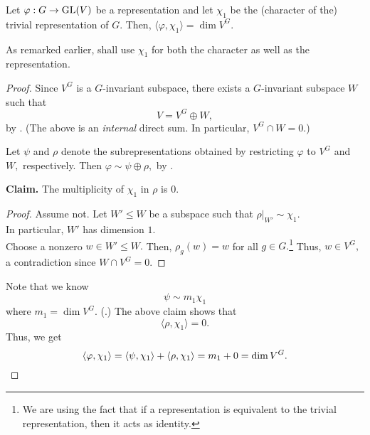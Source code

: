 \begin{prop} \label{prop:innerprodvarphichifixeddim}
	Let $\varphi : G \to \operatorname{GL}(V)$ be a representation and let $\chi_1$ be the (character of the) trivial representation of $G.$ Then, $\langle \varphi, \chi_1\rangle = \dim V^G.$
\end{prop}

As remarked earlier, shall use $\chi_1$ for both the character as well as the representation.

\begin{proof} 
	Since $V^G$ is a $G$-invariant subspace, there exists a $G$-invariant subspace $W$ such that
	\begin{equation*} 
		V = V^G \oplus W,
	\end{equation*}
	by . (The above is an \emph{internal} direct sum. In particular, $V^G \cap W = 0.$)

	Let $\psi$ and $\rho$ denote the subrepresentations obtained by restricting $\varphi$ to $V^G$ and $W,$ respectively. Then $\varphi \sim \psi \oplus \rho,$ by . 


	\textbf{Claim.} The multiplicity of $\chi_1$ in $\rho$ is $0.$
	\begin{proof} 
		Assume not. Let $W' \le W$ be a subspace such that $\rho|_{W'} \sim \chi_1.$ \\
		In particular, $W'$ has dimension $1.$ \\
		Choose a nonzero $w \in W' \le W.$ Then, $\rho_g(w) = w$ for all $g \in G.$\footnote{We are using the fact that if a representation is equivalent to the trivial representation, then it acts as identity.} Thus, $w \in V^G,$ a contradiction since $W \cap V^G = 0.$
	\end{proof}

	Note that we know
	\begin{equation*} 
		\psi \sim m_1 \chi_1
	\end{equation*}
	where $m_1 = \dim V^G.$ (.) The above claim shows that
	\begin{equation*} 
		\langle \rho, \chi_1\rangle = 0.
	\end{equation*}
	Thus, we get
	\begin{equation*} 
		\langle \varphi, \chi_1\rangle = \langle \psi, \chi_1\rangle + \langle \rho, \chi_1\rangle = m_1 + 0 = \dim V^G. \qedhere
	\end{equation*}
\end{proof}

